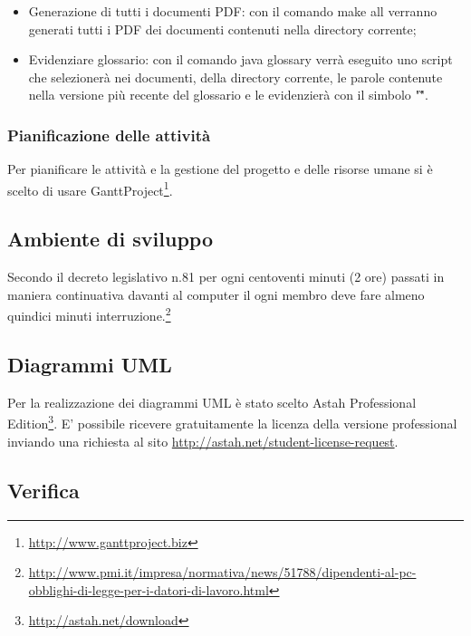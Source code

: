 \begin{itemize}
	\item Generazione di tutti i documenti PDF: con il comando make all verranno generati tutti i PDF dei documenti contenuti nella directory corrente;
	\item Evidenziare glossario: con il comando java glossary verrà eseguito uno script che selezionerà nei documenti, della directory corrente, le parole contenute nella versione più recente del glossario e le evidenzierà con il simbolo "\G".

\end{itemize}

\subsubsection{Pianificazione delle attività}
Per pianificare le attività e la gestione del progetto e delle risorse umane si è scelto di usare GanttProject\footnote{\url{http://www.ganttproject.biz}}.

\subsection{Ambiente di sviluppo}
Secondo il decreto legislativo n.81 per ogni centoventi minuti (2 ore) passati in maniera continuativa davanti al computer il ogni membro deve fare almeno quindici minuti interruzione.\footnote{\url{http://www.pmi.it/impresa/normativa/news/51788/dipendenti-al-pc-obblighi-di-legge-per-i-datori-di-lavoro.html}}

\subsection{Diagrammi UML}

Per la realizzazione dei diagrammi UML è stato scelto Astah Professional Edition\footnote{\url{http://astah.net/download}}.
E' possibile ricevere gratuitamente la licenza della versione professional inviando una richiesta al sito \url{http://astah.net/student-license-request}.

\subsection{Verifica}

